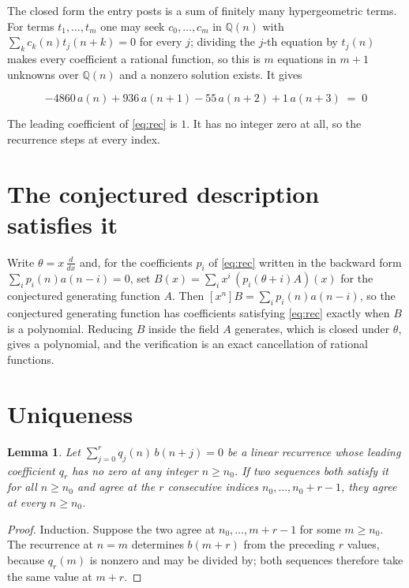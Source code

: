 \documentclass[11pt,a4paper]{article}
\theoremstyle{plain}
\newtheorem{lemma}[theorem]{Lemma}
\theoremstyle{definition}
\begin{document}
The closed form the entry posts is a sum of finitely many hypergeometric terms. For terms $t_{1},\dots,t_{m}$ one may seek $c_{0},\dots,c_{m}$ in $\mathbb{Q}(n)$ with $\sum_{k}c_{k}(n)t_{j}(n+k)=0$ for every $j$; dividing the $j$-th equation by $t_{j}(n)$ makes every coefficient a rational function, so this is $m$ equations in $m+1$ unknowns over $\mathbb{Q}(n)$ and a nonzero solution exists. It gives

\begin{equation}\label{eq:rec}
-4860\,a(n) + 936\,a(n+1) - 55\,a(n+2) + 1\,a(n+3) \;=\; 0
\end{equation}

The leading coefficient of \eqref{eq:rec} is $1$. It has no integer zero at all, so the recurrence steps at every index.

\section{The conjectured description satisfies it}

Write $\theta=x\,\frac{d}{dx}$ and, for the coefficients $p_{i}$ of \eqref{eq:rec} written in the backward form $\sum_{i}p_{i}(n)a(n-i)=0$, set $B(x)=\sum_{i}x^{i}\,(p_{i}(\theta+i)A)(x)$ for the conjectured generating function $A$. Then $[x^{n}]B=\sum_{i}p_{i}(n)a(n-i)$, so the conjectured generating function has coefficients satisfying \eqref{eq:rec} exactly when $B$ is a polynomial. Reducing $B$ inside the field $A$ generates, which is closed under $\theta$, gives a polynomial, and the verification is an exact cancellation of rational functions.

\section{Uniqueness}

\begin{lemma}\label{lem:unique}
Let $\sum_{j=0}^{r}q_{j}(n)\,b(n+j)=0$ be a linear recurrence whose leading coefficient
$q_{r}$ has no zero at any integer $n\ge n_{0}$. If two sequences both satisfy it for all
$n\ge n_{0}$ and agree at the $r$ consecutive indices $n_{0},\dots,n_{0}+r-1$, they agree
at every $n\ge n_{0}$.
\end{lemma}

\begin{proof}
Induction. Suppose the two agree at $n_{0},\dots,m+r-1$ for some $m\ge n_{0}$. The
recurrence at $n=m$ determines $b(m+r)$ from the preceding $r$ values, because $q_{r}(m)$
is nonzero and may be divided by; both sequences therefore take the same value at $m+r$.
\end{proof}
\end{document}

